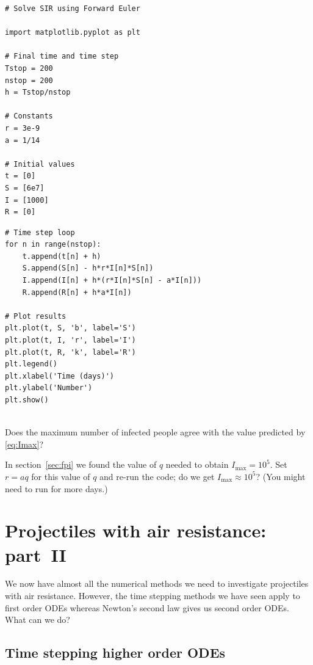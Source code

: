 \vspace{5mm}
\begin{minipage}{7cm}
\begin{verbatim}
# Solve SIR using Forward Euler

import matplotlib.pyplot as plt

# Final time and time step
Tstop = 200
nstop = 200
h = Tstop/nstop

# Constants
r = 3e-9
a = 1/14

# Initial values
t = [0]
S = [6e7]
I = [1000]
R = [0]
\end{verbatim}
\end{minipage}
\begin{minipage}{8cm}
\begin{verbatim}
# Time step loop
for n in range(nstop):
    t.append(t[n] + h)
    S.append(S[n] - h*r*I[n]*S[n])
    I.append(I[n] + h*(r*I[n]*S[n] - a*I[n]))
    R.append(R[n] + h*a*I[n])

# Plot results
plt.plot(t, S, 'b', label='S')
plt.plot(t, I, 'r', label='I')
plt.plot(t, R, 'k', label='R')
plt.legend()
plt.xlabel('Time (days)')
plt.ylabel('Number')
plt.show()


\end{verbatim}
\end{minipage}

\vspace{5mm}

\noindent
Does the maximum number of infected people agree with the value predicted
by \eqref{eq:Imax}?

\vspace{3mm}

\noindent
In section~\ref{sec:fpi} we found the value of $q$ needed to obtain $I_\mathrm{max} = 10^5$.
Set $r = aq$ for this value of $q$ and re-run the code; do we get $I_\mathrm{max} \approx 10^5$?
(You might need to run for more days.)


\section{Projectiles with air resistance: part~II}

We now have almost all the numerical methods we need to investigate projectiles
with air resistance. However, the time stepping methods we have seen apply to
first order ODEs whereas Newton's second law gives us second order ODEs. What
can we do?

\subsection{Time stepping higher order ODEs}
\label{sec:step_higher_systems}

